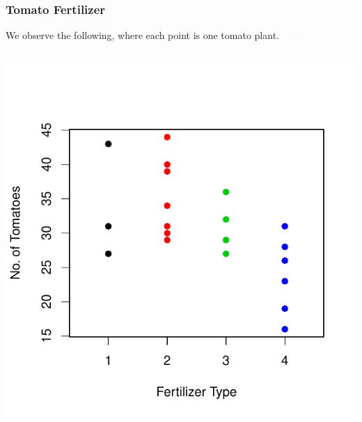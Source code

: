 \documentclass[handout]{beamer}
\begin{document}
\begin{frame}
\frametitle{Tomato Fertilizer}
We observe the following, where each point is one tomato plant. \textcolor{white}{Plot the sample mean of each level.} \textcolor{white}{Question: are the mean tomato yields different?}  
\begin{center}
\includegraphics{figure/lec22-003}
\end{center}
\end{frame}
\end{document}
